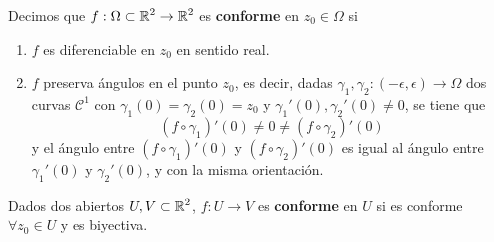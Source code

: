 \begin{definition}
Decimos que $\displaystyle f : \Omega \subset \mathbb{R}^{2} \to \mathbb{R}^{2} $ es \textbf{conforme} en $\displaystyle z_{0}\in \Omega  $ si
\begin{enumerate}
\item $\displaystyle f $ es diferenciable en $\displaystyle z_{0} $ en sentido real.
\item $\displaystyle f $ preserva ángulos en el punto $\displaystyle z_{0} $, es decir, dadas $\displaystyle \gamma_{1}, \gamma_{2} : \left(-\epsilon, \epsilon \right)\to \Omega  $ dos curvas $\displaystyle \mathcal{C}^{1} $ con $\displaystyle \gamma_{1}\left(0\right)=\gamma_{2}\left(0\right)=z_{0} $ y $\displaystyle \gamma_{1}'\left(0\right), \gamma_{2}'\left(0\right)\neq 0 $, se tiene que 
	\[\left(f\circ\gamma_{1}\right)'\left(0\right)\neq 0 \neq \left(f\circ\gamma_{2}\right)'\left(0\right) \]
	y el ángulo entre $\displaystyle \left(f\circ \gamma_{1}\right)'\left(0\right) $ y $\displaystyle \left(f\circ\gamma_{2}\right)'\left(0\right) $ es igual al ángulo entre $\displaystyle \gamma_{1}'\left(0\right) $ y $\displaystyle \gamma_{2}'\left(0\right) $, y con la misma orientación.
\end{enumerate}
Dados dos abiertos $\displaystyle U,V \subset \mathbb{R}^{2} $, $\displaystyle f : U \to V $ es \textbf{conforme} en $\displaystyle U $ si es conforme $\displaystyle \forall z_{0} \in U $ y es biyectiva.
\end{definition}

